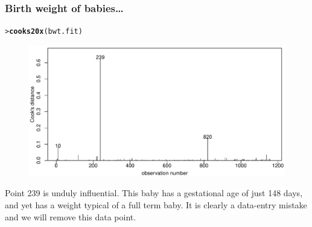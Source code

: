\documentclass{beamer}\usepackage[]{graphicx}\usepackage[]{xcolor}
\makeatletter
\newcommand{\hlstd}[1]{\textcolor[rgb]{0.345,0.345,0.345}{#1}}%
\newcommand{\hlkwd}[1]{\textcolor[rgb]{0.737,0.353,0.396}{\textbf{#1}}}%
\newenvironment{kframe}{%
 \def\at@end@of@kframe{}%
 \ifinner\ifhmode%
  \def\at@end@of@kframe{\end{minipage}}%
  \begin{minipage}{\columnwidth}%
 \fi\fi%
 \def\FrameCommand##1{\hskip\@totalleftmargin \hskip-\fboxsep
 \colorbox{shadecolor}{##1}\hskip-\fboxsep
     \hskip-\linewidth \hskip-\@totalleftmargin \hskip\columnwidth}%
 \MakeFramed {\advance\hsize-\width
   \@totalleftmargin\z@ \linewidth\hsize
   \@setminipage}}%
 {\par\unskip\endMakeFramed%
 \at@end@of@kframe}
\newenvironment{knitrout}{}{} %
\makeatother
\begin{document}
\begin{frame}[fragile]
\frametitle{Birth weight of babies\ldots}
\begin{knitrout}\scriptsize
{}\color{fgcolor}\begin{kframe}
\begin{alltt}
\hlstd{> }\hlkwd{cooks20x}\hlstd{(bwt.fit)}
\end{alltt}
\end{kframe}
\end{knitrout}



\begin{figure}
  \centering
  \includegraphics[scale = 0.5]{figure/RC-H10-024}
\end{figure}

Point 239 is unduly influential. 
This baby has a gestational age of just 148 days, and yet has a weight typical of a full term baby. It is clearly a data-entry mistake and we will remove this data point.
\end{frame}
\end{document}
